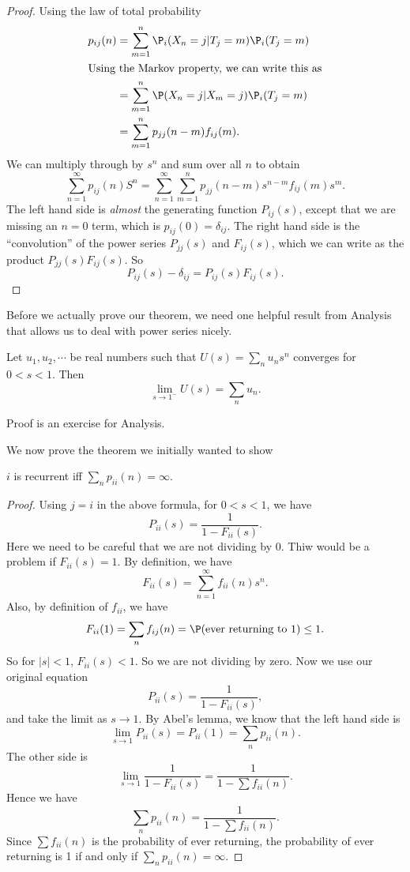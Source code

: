 \documentclass[a4paper]{article}
\begin{document}
\begin{proof}
  Using the law of total probability
  \begin{align*}
    p_{ij}(n) &= \sum_{m = 1}^n \P_i(X_n = j| T_j = m) \P_i(T_j = m) \\
    \intertext{Using the Markov property, we can write this as}
    &= \sum_{m = 1}^n \P(X_n = j| X_m = j) \P_i(T_j = m)\\
    &= \sum_{m = 1}^n p_{jj}(n - m) f_{ij}(m).
  \end{align*}
  We can multiply through by $s^n$ and sum over all $n$ to obtain
  \[
    \sum_{n = 1}^\infty p_{ij}(n) S^n = \sum_{n = 1}^\infty \sum_{m = 1}^n p_{jj}(n - m)s^{n - m} f_{ij}(m)s^m.
  \]
  The left hand side is \emph{almost} the generating function $P_{ij}(s)$, except that we are missing an $n = 0$ term, which is $p_{ij}(0) = \delta_{ij}$. The right hand side is the ``convolution'' of the power series $P_{jj}(s)$ and $F_{ij}(s)$, which we can write as the product $P_{jj}(s) F_{ij}(s)$. So
  \[
    P_{ij}(s) - \delta_{ij} = P_{ij}(s) F_{ij}(s).
  \]
\end{proof}

Before we actually prove our theorem, we need one helpful result from Analysis that allows us to deal with power series nicely.
\begin{lemma}
  Let $u_1, u_2, \cdots$ be real numbers such that $U(s) = \sum_{n} u_n s^n$ converges for $0 < s < 1$. Then
  \[
    \lim_{s\to 1^-} U(s) = \sum_n u_n.
  \]
\end{lemma}
Proof is an exercise for Analysis.

We now prove the theorem we initially wanted to show
\begin{thm}
  $i$ is recurrent iff $\sum_n p_{ii}(n) = \infty$.
\end{thm}

\begin{proof}
  Using $j = i$ in the above formula, for $0 < s < 1$, we have
  \[
    P_{ii}(s) = \frac{1}{1 - F_{ii} (s)}.
  \]
  Here we need to be careful that we are not dividing by $0$. Thiw would be a problem if $F_{ii}(s) = 1$. By definition, we have
  \[
    F_{ii}(s) = \sum_{n = 1}^\infty f_{ii}(n) s^n.
  \]
  Also, by definition of $f_{ii}$, we have
  \[
    F_{ii}(1) = \sum_n f_{ij}(n) = \P(\text{ever returning to }1) \leq 1.
  \]
  So for $|s| < 1$, $F_{ii}(s) < 1$. So we are not dividing by zero. Now we use our original equation
  \[
    P_{ii}(s) = \frac{1}{1 - F_{ii} (s)},
  \]
  and take the limit as $s \to 1$. By Abel's lemma, we know that the left hand side is
  \[
    \lim_{s \to 1}P_{ii}(s) = P_{ii}(1) = \sum_n p_{ii}(n).
  \]
  The other side is
  \[
    \lim_{s \to 1}\frac{1}{1 - F_{ii}(s)} = \frac{1}{1 - \sum f_{ii}(n)}.
  \]
  Hence we have
  \[
    \sum_n p_{ii}(n) = \frac{1}{1 - \sum f_{ii}(n)}.
  \]
  Since $\sum f_{ii}(n)$ is the probability of ever returning, the probability of ever returning is 1 if and only if $\sum_n p_{ii}(n) = \infty$.
\end{proof}
\end{document}
